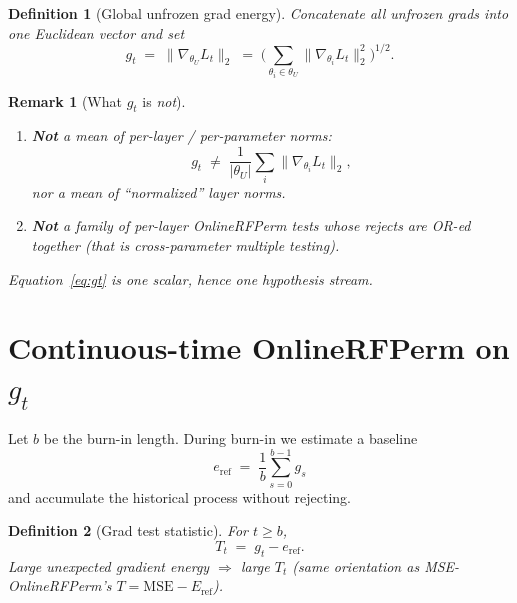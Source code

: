 \documentclass[11pt]{article}
\newtheorem{definition}{Definition}
\newtheorem{remark}{Remark}
\begin{document}
\begin{definition}[Global unfrozen grad energy]
Concatenate all unfrozen grads into one Euclidean vector and set
\begin{equation}
\label{eq:gt}
  g_t
  \;=\;
  \bigl\| \nabla_{\theta_U} L_t \bigr\|_2
  \;=\;
  \Biggl(
    \sum_{\theta_i \in \theta_U}
      \bigl\| \nabla_{\theta_i} L_t \bigr\|_2^{2}
  \Biggr)^{1/2}.
\end{equation}
\end{definition}

\begin{remark}[What $g_t$ is \emph{not}]
\label{rem:not}
\begin{enumerate}[leftmargin=*,itemsep=0.25em]
  \item \textbf{Not} a mean of per-layer / per-parameter norms:
  \[
    g_t
    \;\neq\;
    \frac{1}{|\theta_U|}
    \sum_{i}
      \bigl\| \nabla_{\theta_i} L_t \bigr\|_2,
  \]
  nor a mean of ``normalized'' layer norms.
  \item \textbf{Not} a family of per-layer OnlineRFPerm tests whose
  rejects are OR-ed together (that is cross-parameter multiple testing).
\end{enumerate}
Equation~\eqref{eq:gt} is one scalar, hence one hypothesis stream.
\end{remark}

\section{Continuous-time OnlineRFPerm on $g_t$}
\label{sec:rfperm}

Let $b$ be the burn-in length. During burn-in we estimate a baseline
\begin{equation}
\label{eq:eref}
  e_{\mathrm{ref}}
  \;=\;
  \frac{1}{b}\sum_{s=0}^{b-1} g_s
\end{equation}
and accumulate the historical process without rejecting.

\begin{definition}[Grad test statistic]
For $t\ge b$,
\begin{equation}
\label{eq:Tt}
  T_t
  \;=\;
  g_t - e_{\mathrm{ref}}.
\end{equation}
Large unexpected gradient energy $\Rightarrow$ large $T_t$
(same orientation as MSE-OnlineRFPerm's $T=\mathrm{MSE}-E_{\mathrm{ref}}$).
\end{definition}
\end{document}
